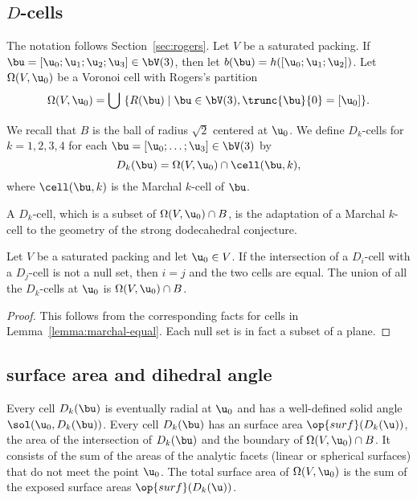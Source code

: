 \subsection{$D$-cells}



The notation follows Section~\ref{sec:rogers}.  Let $V$ be a saturated
packing. If $\bu =[\u_0;\u_1;\u_2;\u_3]\in \bV(3)$, then let $b(\bu) = h([
\u_0; \u_1; \u_2])$.  
Let $\Omega( V,\u_0)$ be a Voronoi cell with  Rogers's partition 
\[
\Omega(V, \u_0) = \bigcup \ \{ R( \bu) \mid { \bu\in  \bV(3), \trunc{\bu}{0}= [\u_0] }\}.
\]
%
%

\begin{definition}[$D_k$-cell]
  We recall that $B$ is the ball of radius $\sqrt2$ centered at
  $\u_0$.  We define $D_k$-cells for $k=1,2,3,4$ for each $
  \bu=[\u_0;\ldots;\u_3]\in \bV(3)$ by
\[
D_k(\bu) = \Omega(V,\u_0)\cap \cell(\bu,k),
\]
where $\cell(\bu,k)$ is the  Marchal $k$-cell of $\bu$.
\end{definition}
%
%
%


A $D_k$-cell, which is a subset of
$\Omega(V,\u_0)\cap B$, is the adaptation of a Marchal $k$-cell to the
geometry of the strong dodecahedral conjecture.  

\begin{lemma}[]
  Let $V$ be a saturated packing and let $\u_0\in V$.  If the intersection
of a $D_i$-cell with a $D_j$-cell is not a null set, then $i=j$ and the two
cells are equal.   The union
  of all the $D_k$-cells at $\u_0$ is $\Omega(V, \u_0)\cap B$.
\end{lemma}
%

\begin{proof} This follows from the corresponding facts for cells in
  Lemma~\ref{lemma:marchal-equal}.  Each null set is in fact a subset
  of a plane.
\end{proof}


\subsection{surface area and dihedral angle}

Every cell $D_k(\bu)$ is eventually radial at $ \u_0$ and has a
well-defined solid angle $\sol(\u_0,D_k(\bu))$.  Every cell $D_k(\bu)$ has
an  surface area $\op{surf}(D_k(\u))$, the area of
the intersection of $D_k(\bu)$ and the boundary of $\Omega(V,
\u_0)\cap B$.  It consists of the sum of the areas of the analytic
facets (linear or spherical surfaces) that do not meet the point $
\u_0$.  The total surface area of $\Omega(V,\u_0)$ is the sum of the
exposed surface areas $\op{surf}(D_k(\u))$.  %

